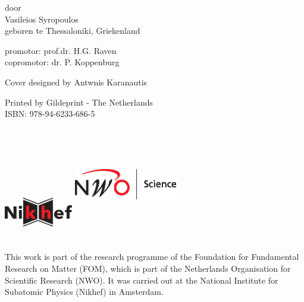 \begin{titlepage}
\begin{center}
door\\
\vspace{0.5cm}
Vasileios Syropoulos\\
\vspace{0.5cm}
geboren te Thessaloniki, Griekenland

\end{center}

\clearpage

\begin{flushleft}
promotor: prof.dr. H.G. Raven\\
copromotor: dr. P. Koppenburg
\end{flushleft}

\vfill


\clearpage

\begin{center}
	Cover designed by Antwnis Karanautis\\

	\vspace{1cm}

	\vspace{0.1cm}
	Printed by Gildeprint - The Netherlands\\
	ISBN: 978-94-6233-686-5

	\vspace{9cm}

	\includegraphics[width=3cm,height=2.5cm,keepaspectratio]{Figures/nikhef-logo.eps}
	\hspace{2cm}
	\includegraphics[width=4.5cm,height=5cm,keepaspectratio]{Figures/nwo-logo.eps}
\end{center}

	\noindent This work is part of the research programme of the Foundation for Fundamental
	Research on Matter (FOM), which is part of the Netherlands Organisation for
	Scientific Research (NWO). It was carried out at the National Institute for
	Subatomic Physics (Nikhef) in Amsterdam.

\end{titlepage}
